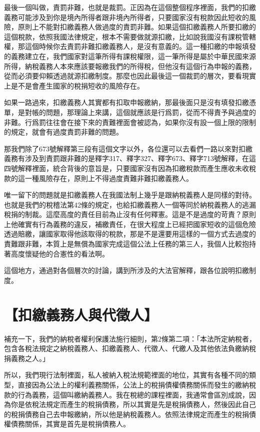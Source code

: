 \documentclass[oneside,sub3section]{ctexbook}
\begin{document}
最後一個叫做，責罰非難，也就是裁罰。正因為在這個整個程序裡面，我們的扣繳義務可能涉及到你是境內所得者跟非境內所得者，只要國家沒有稅款因此短收的風險，原則上不能對扣繳義務人做過度的責罰非難。如果這個扣繳義務人所要扣繳的這個稅款，依照我國法律規定，根本不需要做就源扣繳，比如說我國沒有課稅管轄權，那這個時候你去責罰非難扣繳義務人，是沒有意義的。這一種扣繳的申報填發的義務建立在，我們國家對這筆所得有課稅權限，這一筆所得是屬於中華民國來源所得，納稅義務人本來應該要報繳我們的所得稅，但他沒有這個行為申報的義務，從而必須要仰賴透過就源扣繳制度。那麼也因此最後這一個裁罰的層次，要看現實上是不是會產生國家的稅捐短收的風險存在。

如果一路過來，扣繳義務人其實都有扣取申報繳納，那最後面只是沒有填發扣繳憑單，是對帳的問題，那理論上來講，這個就應該是行爲罰，從而不得責予與過度的非難。行爲罰往往會在接下來的責難裡面會被認為，如果你沒有設一個上限的限制的規定，就會有過度責罰非難的問題。

那我們除了673號解釋第三段有這個文字以外，各位還可以去看們一路以來對扣繳義務有涉及到責罰跟非難的是釋字317、釋字327、釋字673、釋字713號解釋，在這四號解釋裡面，統合背後的意旨是，只要國家沒有因為扣繳稅款而產生應收未收稅款的這一種風險存在，原則上不得過度責難非難扣繳義務人。

唯一留下的問題就是扣繳義務人在我國法制上幾乎是跟納稅義務人是同樣的對待。也就是我們的稅稽法第42條的規定，也給扣繳義務人一個等同於納稅義務人的逃漏稅捐的制裁。這麼高度的責任目前為止沒有任何釋憲。這是不是過度的苛責？原則上他確實有行為義務的違反，補繳責任，在很大程度上已經把國家短收的這個危險透過賠繳，讓國家取得他該取得的稅款，那是不是還要用這樣的一個方式去過度的責難跟非難，本質上是無償為國家完成這個公法上任務的第三人，我個人比較抱持著高度懷疑他的合憲性的看法啊。

這個地方，通過對各個層次的討論，講到所涉及的大法官解釋，跟各位說明扣繳制度。

\hypertarget{ux6263ux7e73ux7fa9ux52d9ux4ebaux8207ux4ee3ux5fb5ux4eba}{%
\section{【扣繳義務人與代徵人】}\label{ux6263ux7e73ux7fa9ux52d9ux4ebaux8207ux4ee3ux5fb5ux4eba}}

補充一下，我們的納稅者權利保護法施行細則，第2條第二項：「本法所定納稅者，包含各稅法規定之納稅義務人、扣繳義務人、代徵人、代繳人及其他依法負繳納稅捐義務之人。」

所以，我們現行法制裡面，私人被納入稅法規範裡面的地位，其實有各種不同的類型，直接因為公法上的權利義務關係，公法上的稅捐債權債務關係而發生的繳納稅款的行為義務，這個叫繳納義務人。我在稅總的課程裡面，我通常會區別成說，因為你是依稅法規定而產生的稅捐債務，所以其實是先是稅捐債務人，然後因此自己的稅捐債務自己去申報繳納，所以他是納稅義務人。依照法律規定而產生的稅捐債權債務關係，其實是首先是稅捐債務人。
\end{document}
